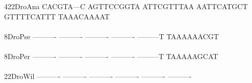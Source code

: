 \documentclass[11pt,twoside,reqno,a4paper]{article}
\begin{document}
{422\hspace*{2\charwidth}DroAna	CACGTA---C	AGTTCCGGTA	ATTCGTTTAA	AATTCATGCT	GTTTTCATTT	TAAACAAAAT	\\
\hspace*{5\charwidth}\hspace*{7\charwidth}\hspace*{1\charwidth}\hspace*{1\charwidth}\hspace*{1\charwidth}\hspace*{1\charwidth}\hspace*{1\charwidth}\hspace*{1\charwidth}\\
8\hspace*{4\charwidth}DroPse	----------	----------	----------	----------	---------T	TAAAAAACGT	\\
\hspace*{5\charwidth}\hspace*{7\charwidth}\hspace*{1\charwidth}\hspace*{1\charwidth}\hspace*{1\charwidth}\hspace*{1\charwidth}\hspace*{1\charwidth}\hspace*{1\charwidth}\\
8\hspace*{4\charwidth}DroPer	----------	----------	----------	----------	---------T	TAAAAAGCAT	\\
\hspace*{5\charwidth}\hspace*{7\charwidth}\hspace*{1\charwidth}\hspace*{1\charwidth}\hspace*{1\charwidth}\hspace*{1\charwidth}\hspace*{1\charwidth}\hspace*{1\charwidth}\\
22\hspace*{3\charwidth}DroWil	----------	----------	----------	----------	----------	----------	\\
\hspace*{5\charwidth}\hspace*{7\charwidth}\hspace*{1\charwidth}\hspace*{1\charwidth}\hspace*{1\charwidth}\hspace*{1\charwidth}\hspace*{1\charwidth}\hspace*{1\charwidth}\\
}
\end{document}
